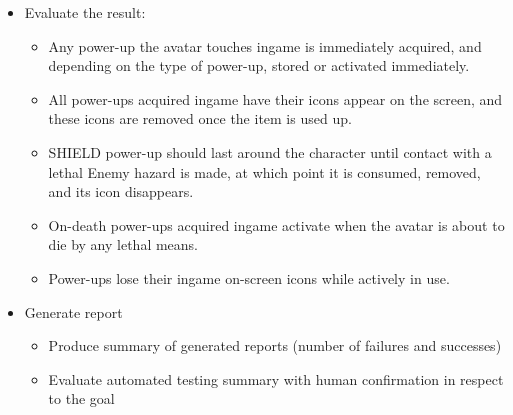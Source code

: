 \begin{itemize}
\item Evaluate the result: 
\begin{itemize}
\item Any power-up the avatar touches ingame is immediately acquired, and depending on the type of power-up, stored or activated immediately.
\item All power-ups acquired ingame have their icons appear on the screen, and these icons are removed once the item is used up.
\item SHIELD power-up should last around the character until contact with a lethal Enemy hazard is made, at which point it is consumed, removed, and its icon disappears.
\item On-death power-ups acquired ingame activate when the avatar is about to die by any lethal means.
\item Power-ups lose their ingame on-screen icons while actively in use.

\end{itemize}

\item Generate report 
\begin{itemize}
\item Produce summary of generated reports (number of failures and successes)
\item Evaluate automated testing summary with human confirmation in respect to the goal
\end{itemize}
\end{itemize}

